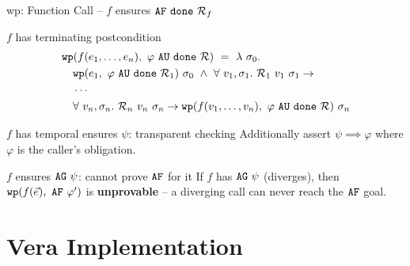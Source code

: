 \documentclass[aspectratio=169]{beamer}
\newcommand{\rcall}[2]{\ensuremath{#1(#2)}}
\newcommand{\wpx}[2]{\ensuremath{\mathtt{wp}(#1,~#2)}}
\begin{document}
\begin{frame}{wp: Function Call -- $f$ ensures $\AF{\done{\R_f}}$}
  \begin{block}{$f$ has terminating postcondition}
    \begin{align*}
    &\wpx{\rcall{f}{e_1, \ldots, e_n}}{\AU{\varphi}{\done{\R}}} ~=~ \lambda~\sigma_0. \\
    &\quad \wpx{e_1}{\AU{\varphi}{\done{\R_1}}}~\sigma_0 ~\land~ \forall~v_1,\sigma_1.~ \R_1~v_1~\sigma_1 \to \\
    &\quad \cdots \\
    &\quad \forall~v_n,\sigma_n.~ \R_n~v_n~\sigma_n \to \wpx{\rcall{f}{v_1,\ldots,v_n}}{\AU{\varphi}{\done{\R}}}~\sigma_n
    \end{align*}
  \end{block}

  \begin{block}{$f$ has temporal ensures $\psi$: transparent checking}
    Additionally assert $\psi \implies \varphi$ where $\varphi$ is the caller's obligation.
  \end{block}

  \begin{block}{$f$ ensures $\AG{\psi}$: cannot prove $\AF{}$ for it}
    If $f$ has $\AG{\psi}$ (diverges), then $\wpx{\rcall{f}{\vec{e}}}{\AF{\varphi'}}$ is \textbf{unprovable} --
    a diverging call can never reach the $\AF{}$ goal.
  \end{block}
\end{frame}

\section{Vera Implementation}
\end{document}
